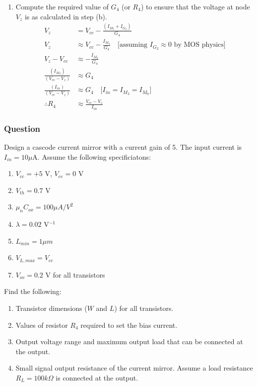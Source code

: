 \begin{enumerate}
    can be computed using the current gain relation
    from step (a).
  \item Compute the required value of $G_4$ (or
    $R_4$) to ensure that the voltage at node
    $V_{z}$ is as calculated in step (b).
    \begin{align*}
      V_{z} &= V_{cc} - \frac{(I_{M_3} + I_{G_2})}{G_4} \\
      V_{z} &\approx V_{cc} - \frac{I_{M_3}}{G_4} \quad \text{[assuming } I_{G_2} \approx 0 \text{ by MOS physics]} \\
      V_{z} - V_{cc} &\approx - \frac{I_{M_3}}{G_4} \\
      \frac{(I_{M_3})}{(V_{cc} - V_{z})} &\approx G_4 \\
      \frac{(I_{in})}{(V_{cc} - V_{z})} &\approx G_4 \quad \text{[} I_{in} = I_{M_3} = I_{M_0} \text{]} \\
      \therefore R_4 &\approx \frac{V_{cc} - V_{z}}{I_{in}}
    \end{align*}
\end{enumerate}

\subsubsection{Question}
Design a cascode current mirror with a current
gain of 5. The input current is $I_{in} = 10 \mu$A.
Assume the following specificiatons:
\begin{enumerate}
  \item $V_{cc} = +5$ V, $V_{ee} = 0$ V
  \item $V_{th} = 0.7$ V
  \item $\mu_n C_{ox} = 100 \mu A/V^2$
  \item $\lambda = 0.02$ V$^{-1}$
  \item $L_{min} = 1 \mu m$
  \item $V_{L, max} = V_{cc}$
  \item $V_{ov} = 0.2$ V for all transistors
\end{enumerate}
Find the following:
\begin{enumerate}
  \item Transistor dimensions ($W$ and $L$) for all
    transistors.
  \item Values of resistor $R_4$ required to set
    the bias current.
  \item Output voltage range and maximum output
    load that can be connected at the output.
  \item Small signal output resistance of the
    current mirror. Assume a load resistance
    $R_L = 100 k\Omega$ is connected at the
    output.
\end{enumerate}
